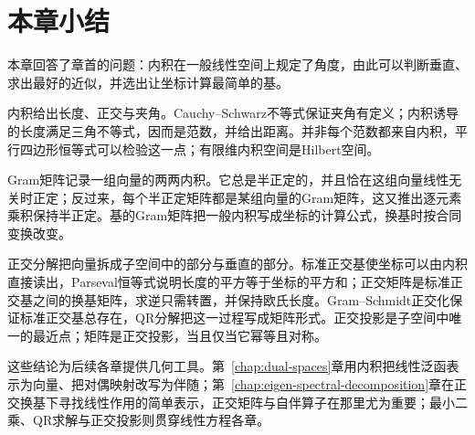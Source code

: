\section{本章小结}
\label{sec:ls-inner-product-spaces-summary}

本章回答了章首的问题：内积在一般线性空间上规定了角度，由此可以判断垂直、求出最好的近似，并选出让坐标计算最简单的基。

内积给出长度、正交与夹角。Cauchy--Schwarz不等式保证夹角有定义；内积诱导的长度满足三角不等式，因而是范数，并给出距离。并非每个范数都来自内积，平行四边形恒等式可以检验这一点；有限维内积空间是Hilbert空间。

Gram矩阵记录一组向量的两两内积。它总是半正定的，并且恰在这组向量线性无关时正定；反过来，每个半正定矩阵都是某组向量的Gram矩阵，这又推出逐元素乘积保持半正定。基的Gram矩阵把一般内积写成坐标的计算公式，换基时按合同变换改变。

正交分解把向量拆成子空间中的部分与垂直的部分。标准正交基使坐标可以由内积直接读出，Parseval恒等式说明长度的平方等于坐标的平方和；正交矩阵是标准正交基之间的换基矩阵，求逆只需转置，并保持欧氏长度。Gram--Schmidt正交化保证标准正交基总存在，QR分解把这一过程写成矩阵形式。正交投影是子空间中唯一的最近点；矩阵是正交投影，当且仅当它幂等且对称。

这些结论为后续各章提供几何工具。第~\ref{chap:dual-spaces}章用内积把线性泛函表示为向量、把对偶映射改写为伴随；第~\ref{chap:eigen-spectral-decomposition}章在正交换基下寻找线性作用的简单表示，正交矩阵与自伴算子在那里尤为重要；最小二乘、QR求解与正交投影则贯穿线性方程各章。
